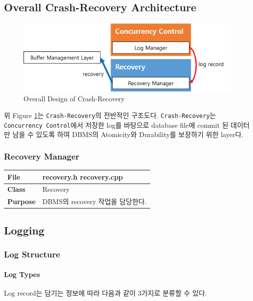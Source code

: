 \documentclass[main.tex]{subfiles}
\begin{document}
\subsection{Overall Crash-Recovery Architecture}
\begin{figure}[!hbt]
	\centering
	\includegraphics[width=.8\textwidth]{images/recovery/overall_architecture.png}
	\caption{Overall Design of Crash-Recovery}
	\label{rc:overall_design}
\end{figure}

위 Figure \ref{rc:overall_design}는 \texttt{Crash-Recovery}의 전반적인 구조도다.
\texttt{Crash-Recovery}는 \texttt{Concurrency Control}에서 저장한 log를 바탕으로 database file에 commit 된 데이터만 남을 수 있도록 하여 DBMS의 Atomicity와 Durability를 보장하기 위한 layer다.

\subsubsection{Recovery Manager}
\begin{table}[!htb]
	\begin{tabularx}{\textwidth}{|l|X|}
		\hline
		\textbf{File} & recovery.h recovery.cpp \\
		\hline
		\textbf{Class} & Recovery \\
		\hline
		\textbf{Purpose} & DBMS의 recovery 작업을 담당한다. \\
		\hline
	\end{tabularx}
\end{table}

\subsection{Logging}
\subsubsection{Log Structure}
\paragraph{Log Types}
Log record는 담기는 정보에 따라 다음과 같이 3가지로 분류할 수 있다.
\end{document}
